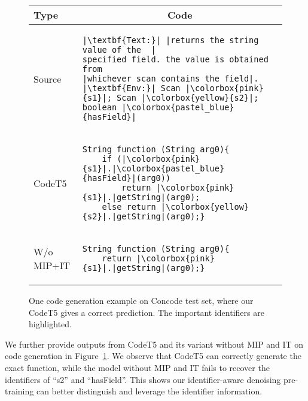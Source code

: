 \documentclass[11pt]{article}
\begin{document}
\begin{figure}[t]
\center
\begin{adjustbox}{width=0.48\textwidth}
\begin{tabular}{p{2cm}p{8cm}}

\toprule
Type & \multicolumn{1}{c}{Code}  \\
\midrule
Source &
\begin{minipage}{\textwidth}
\begin{verbatim}
|\textbf{Text:}| |returns the string value of the  |
specified field. the value is obtained from  
|whichever scan contains the field|.
|\textbf{Env:}| Scan |\colorbox{pink}{s1}|; Scan |\colorbox{yellow}{s2}|; boolean |\colorbox{pastel_blue}{hasField}|
  \end{verbatim}
\end{minipage}\\
\midrule
CodeT5  &
\begin{minipage}{\textwidth}
\begin{verbatim}
String function (String arg0){ 
    if (|\colorbox{pink}{s1}|.|\colorbox{pastel_blue}{hasField}|(arg0)) 
        return |\colorbox{pink}{s1}|.|getString|(arg0); 
    else return |\colorbox{yellow}{s2}|.|getString|(arg0);}
  \end{verbatim} 
\end{minipage}\\
\midrule
W/o MIP+IT &
\begin{minipage}{\textwidth}
\begin{verbatim}
String function (String arg0){ 
    return |\colorbox{pink}{s1}|.|getString|(arg0);}
  \end{verbatim} 
\end{minipage}\\
\bottomrule
\end{tabular}
\end{adjustbox}
\vspace{-0.5em}
\caption{\label{fig:generation_case}
One code generation example on Concode test set, where our CodeT5 gives a correct prediction. The important identifiers  are highlighted.
}
\vspace{-0.5em}
\end{figure} 
We further provide outputs from CodeT5 and its variant without MIP and IT on code generation in Figure~\ref{fig:generation_case}.
We observe that  CodeT5 can correctly generate the exact function, while the model without MIP and IT  fails to recover the identifiers of ``s2'' and ``hasField''. This shows our identifier-aware denoising pre-training can better distinguish and leverage the identifier information.
\end{document}
